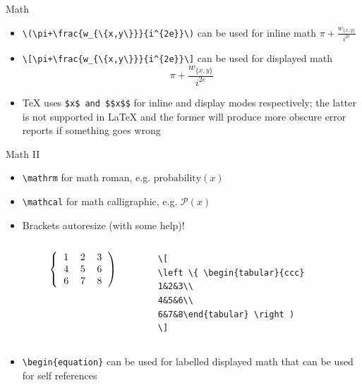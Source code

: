 \documentclass[english]{beamer}
\let\olditem\item
\renewcommand{\item}{\setlength{\itemsep}{\fill}\olditem}
\begin{document}
\begin{frame}[fragile]{Math}
    \begin{itemize}
        \item \verb|\(\pi+\frac{w_{\{x,y\}}}{i^{2e}}\)| can be used for inline math \(\pi+\frac{w_{\{x,y\}}}{i^{2e}}\)
        \item \verb|\[\pi+\frac{w_{\{x,y\}}}{i^{2e}}\]| can be used for displayed math
        \[\pi+\frac{w_{\{x,y\}}}{i^{2e}}\]
        \item \TeX{} uses \verb|$x$ and $$x$$| for inline and display modes respectively; the latter is not supported in \LaTeX{} and the former will produce more obscure error reports if something goes wrong 
        
    \end{itemize}
\end{frame}

\begin{frame}[fragile]{Math II}
    \begin{itemize}
        \item \verb|\mathrm| for math roman, e.g. $\mathrm{probability}(x)$
        \item \verb|\mathcal| for math calligraphic, e.g. $\mathcal{P}(x)$

        \item Brackets autoresize (with some help)!
        
        \begin{columns}
            \begin{column}{0.5\textwidth}
        \[
        \left \{ \begin{tabular}{ccc} 1&2&3\\4&5&6\\6&7&8\end{tabular} \right )
        \]
            \end{column}
            \begin{column}{0.5\textwidth}
                \begin{verbatim}
\[
\left \{ \begin{tabular}{ccc} 
1&2&3\\
4&5&6\\
6&7&8\end{tabular} \right )
\]
                \end{verbatim}
            \end{column}
        \end{columns}
        

        \item \verb|\begin{equation}| can be used for labelled displayed math that can be used for self references
    \end{itemize}
\end{frame}
\end{document}
